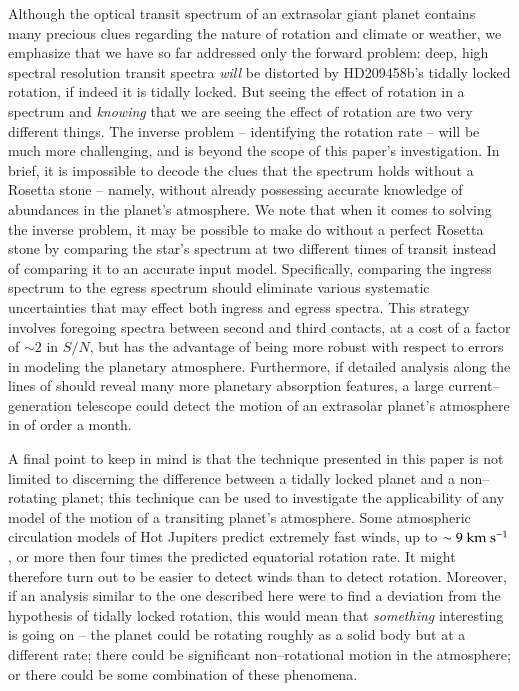 Although the optical transit spectrum of an extrasolar giant planet
contains many precious clues regarding the nature of rotation and
climate or weather, we emphasize that we have so far addressed only
the forward problem: deep, high spectral resolution transit spectra
{\it will} be distorted by HD209458b's tidally locked rotation, if
indeed it is tidally locked.  But seeing the effect of rotation in a
spectrum and {\it knowing} that we are seeing the effect of rotation
are two very different things.  The inverse problem -- identifying the
rotation rate -- will be much more challenging, and is beyond the
scope of this paper's investigation.  In brief, it is impossible to
decode the clues that the spectrum holds without a Rosetta stone --
namely, without already possessing accurate knowledge of abundances in
the planet's atmosphere.  We note that when it comes to solving the
inverse problem, it may be possible to make do without a perfect
Rosetta stone by comparing the star's spectrum at two different times
of transit instead of comparing it to an accurate input model.
Specifically, comparing the ingress spectrum to the egress spectrum
should eliminate various systematic uncertainties that may effect both
ingress and egress spectra.  This strategy involves foregoing spectra
between second and third contacts, at a cost of a factor of $\sim 2$
in $S/N$, but has the advantage of being more robust with respect to
errors in modeling the planetary atmosphere. Furthermore, if detailed
analysis along the lines of \citet{charbonneau_et_al2002} should
reveal many more planetary absorption features, a large
current--generation telescope could detect the motion of an extrasolar
planet's atmosphere in of order a month.

A final point to keep in mind is that the technique presented in this
paper is not limited to discerning the difference between a tidally
locked planet and a non--rotating planet; this technique can be used
to investigate the applicability of any model of the motion of a
transiting planet's atmosphere.  Some atmospheric circulation models
of Hot Jupiters predict extremely fast winds, up to $\sim 9 {\rm
~km~s^{-1}}$, or more then four times the predicted equatorial
rotation rate.  It might therefore turn out to be easier to detect
winds than to detect rotation.  Moreover, if an analysis similar to
the one described here were to find a deviation from the hypothesis of
tidally locked rotation, this would mean that {\it something}
interesting is going on -- the planet could be rotating roughly as a
solid body but at a different rate; there could be significant
non--rotational motion in the atmosphere; or there could be some
combination of these phenomena.
